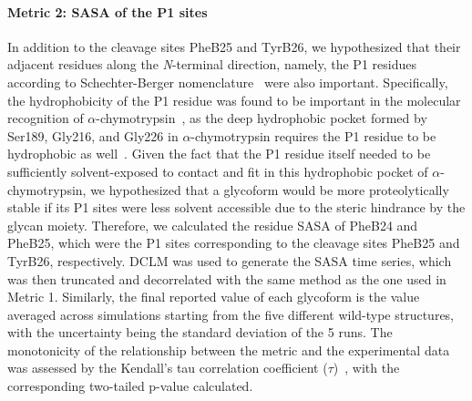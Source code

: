 \documentclass[9pt]{elife}
\begin{document}
\paragraph{Metric 2: SASA of the P1 sites}
In addition to the cleavage sites PheB25 and TyrB26, we hypothesized that their adjacent residues along the \emph{N}-terminal direction, namely, the P1 residues according to Schechter-Berger nomenclature~\cite{schechter1968active} were also important. Specifically, the hydrophobicity of the P1 residue was found to be important in the molecular recognition of $\alpha$-chymotrypsin~\cite{appel1986chymotrypsin}, as the deep hydrophobic pocket formed by Ser189, Gly216, and Gly226 in $\alpha$-chymotrypsin requires the P1 residue to be hydrophobic as well~\cite{hedstrom2002serine}. Given the fact that the P1 residue itself needed to be sufficiently solvent-exposed to contact and fit in this hydrophobic pocket of $\alpha$-chymotrypsin, we hypothesized that a glycoform would be more proteolytically stable if its P1 sites were less solvent accessible due to the steric hindrance by the glycan moiety. Therefore, we calculated the residue SASA of PheB24 and PheB25, which were the P1 sites corresponding to the cleavage sites PheB25 and TyrB26, respectively. DCLM was used to generate the SASA time series, which was then truncated and decorrelated with the same method as the one used in Metric 1. Similarly, the final reported value of each glycoform is the value averaged across simulations starting from the five different wild-type structures, with the uncertainty being the standard deviation of the 5 runs. The monotonicity of the relationship between the metric and the experimental data was assessed by the Kendall's tau correlation coefficient ($\tau$)~\cite{kendall1948advanced}, with the corresponding two-tailed p-value calculated. 
\end{document}
